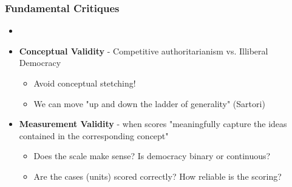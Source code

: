 \documentclass[xcolor=x11names,compress]{beamer}\usepackage[]{graphicx}\usepackage[]{color}
\renewcommand{\(}{\begin{columns}}
\renewcommand{\)}{\end{columns}}
\newcommand{\<}[1]{\begin{column}{#1}}
\renewcommand{\>}{\end{column}}
\begin{document}
\begin{frame}
\frametitle{Fundamental Critiques}
\begin{itemize}
\item 
\item \textbf{Conceptual Validity} - Competitive authoritarianism vs. Illiberal Democracy
\begin{itemize}
\item Avoid conceptual stetching!
\item We can move "up and down the ladder of generality" (Sartori)
\end{itemize}
\item \textbf{Measurement Validity} - when scores "meaningfully capture the ideas contained in the corresponding concept"
\begin{itemize}
\item Does the scale make sense? Is democracy binary or continuous?
\item Are the cases (units) scored correctly? How reliable is the scoring?
\end{itemize}
\end{itemize}
\end{frame}


\end{document}
